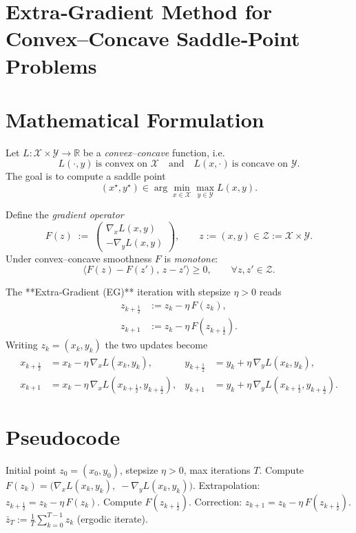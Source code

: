\documentclass{article}
\newcommand{\R}{\mathbb{R}}
\begin{document}
\section*{Extra‑Gradient Method for Convex–Concave Saddle‑Point Problems}

\section*{Mathematical Formulation}
Let $L:\mathcal X\times\mathcal Y\to\R$ be a \emph{convex–concave} function, i.e.  
\[
L(\cdot ,y)\ \text{is convex on }\mathcal X\quad\text{and}\quad
L(x,\cdot )\ \text{is concave on }\mathcal Y .
\]
The goal is to compute a saddle point
\[
(x^{\star},y^{\star})\in\arg\min_{x\in\mathcal X}\max_{y\in\mathcal Y} L(x,y).
\]

Define the \emph{gradient operator}
\[
F(z)\;:=\;\begin{pmatrix}
\nabla_{x} L(x,y)\\[2mm]
-\nabla_{y} L(x,y)
\end{pmatrix},
\qquad z:=(x,y)\in\mathcal Z:=\mathcal X\times\mathcal Y .
\]
Under convex–concave smoothness $F$ is \emph{monotone}:
\[
\langle F(z)-F(z'),\,z-z'\rangle\ge 0,\qquad\forall z,z'\in\mathcal Z .
\]

The **Extra‑Gradient (EG)** iteration with stepsize $\eta>0$ reads
\[
\boxed{
\begin{aligned}
z_{k+\frac12}&:=z_k-\eta\,F(z_k), \tag{1}\\
z_{k+1}&:=z_k-\eta\,F(z_{k+\frac12}). \tag{2}
\end{aligned}}
\]
Writing $z_k=(x_k,y_k)$ the two updates become
\[
\begin{aligned}
x_{k+\frac12}&=x_k-\eta\,\nabla_x L(x_k,y_k), &
y_{k+\frac12}&=y_k+\eta\,\nabla_y L(x_k,y_k),\\[1mm]
x_{k+1}&=x_k-\eta\,\nabla_x L(x_{k+\frac12},y_{k+\frac12}), &
y_{k+1}&=y_k+\eta\,\nabla_y L(x_{k+\frac12},y_{k+\frac12}).
\end{aligned}
\]

\section*{Pseudocode}
\begin{algorithm}[H]
\caption{Extra‑Gradient for $\min_{x}\max_{y}L(x,y)$}
\begin{algorithmic}[1]
\Require Initial point $z_0=(x_0,y_0)$, stepsize $\eta>0$, max iterations $T$.
    \State Compute $F(z_k)=\bigl(\nabla_x L(x_k,y_k),\;-\nabla_y L(x_k,y_k)\bigr)$.
    \State Extrapolation: $z_{k+\frac12}=z_k-\eta\,F(z_k)$.
    \State Compute $F(z_{k+\frac12})$.
    \State Correction: $z_{k+1}=z_k-\eta\,F(z_{k+\frac12})$.
\EndFor
\State \Return $\displaystyle \bar z_T:=\frac1T\sum_{k=0}^{T-1}z_k$ (ergodic iterate).
\end{algorithmic}
\end{algorithm}
\end{document}
